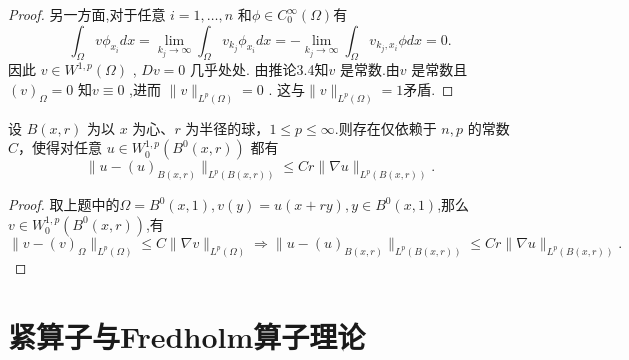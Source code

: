 \documentclass[lang=cn,newtx,10pt,scheme=chinese,thmcnt=chapter]{elegantbook}
\begin{document}
\begin{problemset}
\begin{proof}
另一方面,对于任意 \( i = 1,\ldots ,n \) 和\( \phi  \in  {C}_{0}^{\infty }\left( \Omega\right) \)有
\[ {\int }_{\Omega}v{\phi }_{{x}_{i}}{dx} = \mathop{\lim }\limits_{{{k}_{j} \rightarrow  \infty }}{\int }_{\Omega}{v}_{{k}_{j}}{\phi }_{{x}_{i}}{dx} =  - \mathop{\lim }\limits_{{{k}_{j} \rightarrow  \infty }}{\int }_{\Omega}{v}_{{k}_{j},{x}_{i}}{\phi dx} = 0. \]
因此 \( v \in  {W}^{1,p}\left( \Omega\right) \) , \( {Dv} = 0 \) 几乎处处. 由推论3.4知\( v \) 是常数.由\( v \) 是常数且 \( {\left( v\right) }_{\Omega} = 0 \) 知\( v \equiv  0 \) ,进而
\( \parallel v{\parallel }_{{L}^{p}\left( \Omega\right) } = 0 \) . 这与$\|v\|_{L^p(\Omega)}=1$矛盾.
\end{proof}
\item 设 \(B(x,r)\) 为以 \(x\) 为心、\(r\) 为半径的球，\(1 \leqslant p \leqslant \infty\).则存在仅依赖于 \(n,p\) 的常数 \(C\)，使得对任意 \(u \in {W}_{0}^{1,p}(B^{0}(x,r))\) 都有
\[
\|u - (u)_{B(x,r)}\|_{L^{p}(B(x,r))} \leqslant Cr\|\nabla u\|_{L^{p}(B(x,r))}.
\]
\begin{proof}
    取上题中的$\Omega=B^0(x,1),v(y)=u(x+ry),y\in B^0(x,1)$,那么$v\in {W}_{0}^{1,p}(B^{0}(x,r))$,有
    \[
    \|v-(v)_\Omega\|_{L^p(\Omega)}\leqslant C\|\nabla v\|_{L^p(\Omega)}\Rightarrow \|u - (u)_{B(x,r)}\|_{L^{p}(B(x,r))} \leqslant Cr\|\nabla u\|_{L^{p}(B(x,r))}.
    \]
    
\end{proof}
\end{problemset}
\chapter{紧算子与Fredholm算子理论}
\end{document}
